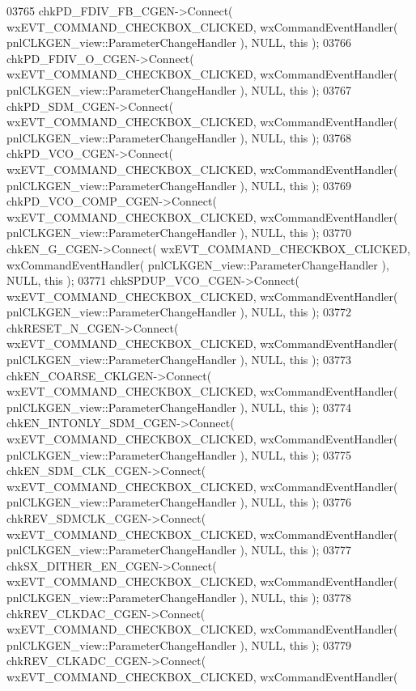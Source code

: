 \begin{DoxyCode}
03765     chkPD_FDIV_FB_CGEN->Connect( wxEVT\_COMMAND\_CHECKBOX\_CLICKED, wxCommandEventHandler( 
      pnlCLKGEN_view::ParameterChangeHandler ), NULL, \textcolor{keyword}{this} );
03766     chkPD_FDIV_O_CGEN->Connect( wxEVT\_COMMAND\_CHECKBOX\_CLICKED, wxCommandEventHandler( 
      pnlCLKGEN_view::ParameterChangeHandler ), NULL, \textcolor{keyword}{this} );
03767     chkPD_SDM_CGEN->Connect( wxEVT\_COMMAND\_CHECKBOX\_CLICKED, wxCommandEventHandler( 
      pnlCLKGEN_view::ParameterChangeHandler ), NULL, \textcolor{keyword}{this} );
03768     chkPD_VCO_CGEN->Connect( wxEVT\_COMMAND\_CHECKBOX\_CLICKED, wxCommandEventHandler( 
      pnlCLKGEN_view::ParameterChangeHandler ), NULL, \textcolor{keyword}{this} );
03769     chkPD_VCO_COMP_CGEN->Connect( wxEVT\_COMMAND\_CHECKBOX\_CLICKED, wxCommandEventHandler( 
      pnlCLKGEN_view::ParameterChangeHandler ), NULL, \textcolor{keyword}{this} );
03770     chkEN_G_CGEN->Connect( wxEVT\_COMMAND\_CHECKBOX\_CLICKED, wxCommandEventHandler( 
      pnlCLKGEN_view::ParameterChangeHandler ), NULL, \textcolor{keyword}{this} );
03771     chkSPDUP_VCO_CGEN->Connect( wxEVT\_COMMAND\_CHECKBOX\_CLICKED, wxCommandEventHandler( 
      pnlCLKGEN_view::ParameterChangeHandler ), NULL, \textcolor{keyword}{this} );
03772     chkRESET_N_CGEN->Connect( wxEVT\_COMMAND\_CHECKBOX\_CLICKED, wxCommandEventHandler( 
      pnlCLKGEN_view::ParameterChangeHandler ), NULL, \textcolor{keyword}{this} );
03773     chkEN_COARSE_CKLGEN->Connect( wxEVT\_COMMAND\_CHECKBOX\_CLICKED, wxCommandEventHandler( 
      pnlCLKGEN_view::ParameterChangeHandler ), NULL, \textcolor{keyword}{this} );
03774     chkEN_INTONLY_SDM_CGEN->Connect( wxEVT\_COMMAND\_CHECKBOX\_CLICKED, wxCommandEventHandler( 
      pnlCLKGEN_view::ParameterChangeHandler ), NULL, \textcolor{keyword}{this} );
03775     chkEN_SDM_CLK_CGEN->Connect( wxEVT\_COMMAND\_CHECKBOX\_CLICKED, wxCommandEventHandler( 
      pnlCLKGEN_view::ParameterChangeHandler ), NULL, \textcolor{keyword}{this} );
03776     chkREV_SDMCLK_CGEN->Connect( wxEVT\_COMMAND\_CHECKBOX\_CLICKED, wxCommandEventHandler( 
      pnlCLKGEN_view::ParameterChangeHandler ), NULL, \textcolor{keyword}{this} );
03777     chkSX_DITHER_EN_CGEN->Connect( wxEVT\_COMMAND\_CHECKBOX\_CLICKED, wxCommandEventHandler( 
      pnlCLKGEN_view::ParameterChangeHandler ), NULL, \textcolor{keyword}{this} );
03778     chkREV_CLKDAC_CGEN->Connect( wxEVT\_COMMAND\_CHECKBOX\_CLICKED, wxCommandEventHandler( 
      pnlCLKGEN_view::ParameterChangeHandler ), NULL, \textcolor{keyword}{this} );
03779     chkREV_CLKADC_CGEN->Connect( wxEVT\_COMMAND\_CHECKBOX\_CLICKED, wxCommandEventHandler( 

\end{DoxyCode}
